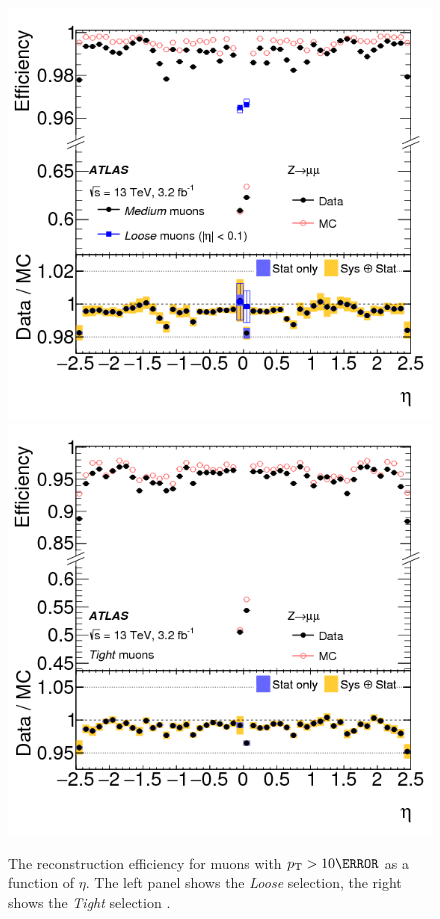 \begin{figure}[h]
    \centering
    \includegraphics[width=.48\textwidth]{chapters/chapter3_eventreco/images/muon-medium.png}
    \includegraphics[width=.48\textwidth]{chapters/chapter3_eventreco/images/muon-tight.png}

    \caption[The reconstruction efficiency for \textit{Loose} and \textit{Tight} muons with $\pt >\unit{10}{\GeV}$ as a function of $\eta$.]
    {The reconstruction efficiency for muons with $\pt >\unit{10}{\GeV}$ as a function of $\eta$. The left panel shows the \textit{Loose} selection, the right shows the \textit{Tight} selection \cite{muon-reco}.}
    \label{fig:muon-eff}
\end{figure}
